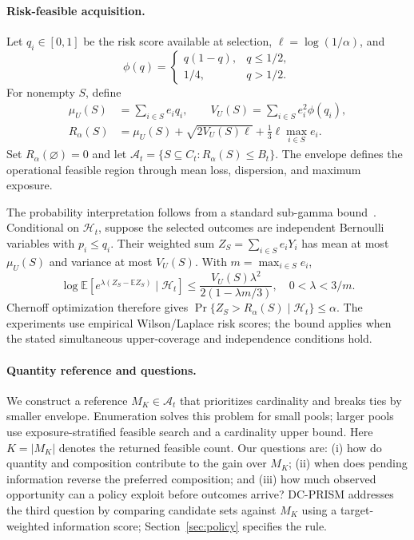 \documentclass[runningheads]{llncs}
\begin{document}
\paragraph{Risk-feasible acquisition.}
Let $q_i\in[0,1]$ be the risk score available at selection, $\ell=\log(1/\alpha)$, and
\begin{equation}
 \phi(q)=\begin{cases}q(1-q),&q\leq 1/2,\\1/4,&q>1/2.\end{cases}
\end{equation}
For nonempty $S$, define
\begin{equation}
\begin{split}
 \mu_U(S)&=\sum_{i\in S}e_iq_i,\qquad
 V_U(S)=\sum_{i\in S}e_i^2\phi(q_i),\\
 R_\alpha(S)&=\mu_U(S)+\sqrt{2V_U(S)\ell}
                  +\tfrac13\ell\max_{i\in S}e_i.
\end{split}\label{eq:envelope}
\end{equation}
Set $R_\alpha(\varnothing)=0$ and let
$\mathcal A_t=\{S\subseteq C_t:R_\alpha(S)\leq B_t\}$.
The envelope defines the operational feasible region through mean loss, dispersion, and maximum exposure.

The probability interpretation follows from a standard sub-gamma bound~\cite{boucheron2013concentration}. Conditional on $\mathcal H_t$, suppose the selected outcomes are independent Bernoulli variables with $p_i\leq q_i$. Their weighted sum $Z_S=\sum_{i\in S}e_iY_i$ has mean at most $\mu_U(S)$ and variance at most $V_U(S)$. With $m=\max_{i\in S}e_i$,
\begin{equation}
 \log\mathbb E\!\left[e^{\lambda(Z_S-\mathbb E Z_S)}\mid\mathcal H_t\right]
 \leq \frac{V_U(S)\lambda^2}{2(1-\lambda m/3)},
 \quad 0<\lambda<3/m.
\end{equation}
Chernoff optimization therefore gives
$\Pr\{Z_S>R_\alpha(S)\mid\mathcal H_t\}\leq\alpha$.
The experiments use empirical Wilson/Laplace risk scores; the bound applies when the stated simultaneous upper-coverage and independence conditions hold.

\paragraph{Quantity reference and questions.}
We construct a reference $M_K\in\mathcal A_t$ that prioritizes cardinality and breaks ties by smaller envelope. Enumeration solves this problem for small pools; larger pools use exposure-stratified feasible search and a cardinality upper bound. Here $K=|M_K|$ denotes the returned feasible count. Our questions are: (i) how do quantity and composition contribute to the gain over $M_K$; (ii) when does pending information reverse the preferred composition; and (iii) how much observed opportunity can a policy exploit before outcomes arrive? DC-PRISM addresses the third question by comparing candidate sets against $M_K$ using a target-weighted information score; Section~\ref{sec:policy} specifies the rule.
\end{document}

